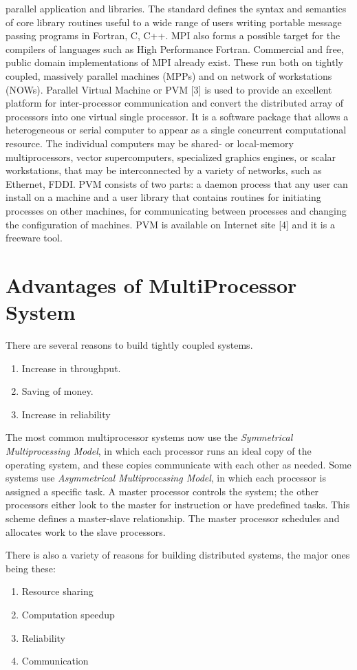 parallel application and libraries. The standard defines the syntax and semantics of core library routines useful to a wide range of users writing portable
message passing programs in Fortran, C, C++. MPI also forms a possible target for the compilers of languages such as High Performance Fortran. Commercial and
free, public domain implementations of MPI already exist. These run both on tightly coupled, massively parallel machines (MPPs) and on network of workstations
(NOWs). Parallel Virtual Machine or PVM [3] is used to provide an excellent platform for inter-processor communication and convert the distributed array of
processors into one virtual single processor. It is a software package that allows a heterogeneous or serial computer to appear as a
single concurrent computational resource. The individual computers may be shared- or local-memory multiprocessors, vector supercomputers, specialized graphics
engines, or scalar workstations, that may be interconnected by a variety of networks, such as Ethernet, FDDI. PVM consists of two parts: a daemon process that
any user can install on a machine and a user library that contains routines for initiating processes on other machines, for communicating between processes
and changing the configuration of machines. PVM is available on Internet site [4] and it is a freeware tool. \par

\section{Advantages of MultiProcessor System}
There are several reasons to build tightly coupled systems.

\begin{enumerate}
\item Increase in throughput.
\item Saving of money.
\item Increase in reliability
\end{enumerate}
\hspace{1in} The most common multiprocessor systems now use the {\em Symmetrical Multiprocessing Model}, in which each processor runs an ideal copy  of the
operating system, and these copies communicate with each other as needed. Some systems use {\em Asymmetrical Multiprocessing Model}, in which each processor
is assigned a specific task. A master processor controls the system; the other processors either look to the master for instruction or have predefined tasks. 
This scheme defines a master-slave relationship. The master processor schedules and allocates work to the slave processors.\par
\hspace{1in} There is also a variety of reasons for building distributed systems, the major ones being these:
\begin{enumerate}
\item Resource sharing
\item Computation speedup
\item Reliability
\item Communication
\end{enumerate} 
 
